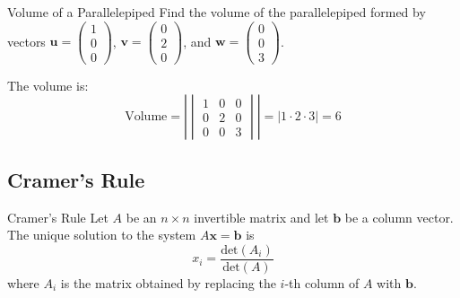\documentclass[12pt,a4paper]{article}
\newcommand{\vv}[1]{\mathbf{#1}}
\newcommand{\Det}{\text{det}}
\begin{document}
	\begin{example}{Volume of a Parallelepiped}
		Find the volume of the parallelepiped formed by vectors $\vv{u} = \begin{pmatrix} 1 \\ 0 \\ 0 \end{pmatrix}$, $\vv{v} = \begin{pmatrix} 0 \\ 2 \\ 0 \end{pmatrix}$, and $\vv{w} = \begin{pmatrix} 0 \\ 0 \\ 3 \end{pmatrix}$.
		
		The volume is:
		\[
		\text{Volume} = \left| \begin{vmatrix} 1 & 0 & 0 \\ 0 & 2 & 0 \\ 0 & 0 & 3 \end{vmatrix} \right| = |1 \cdot 2 \cdot 3| = 6
		\]
	\end{example}
	
	\subsection{Cramer's Rule}
	
	\begin{theorem}{Cramer's Rule}
		Let $A$ be an $n \times n$ invertible matrix and let $\vv{b}$ be a column vector. The unique solution to the system $A\vv{x} = \vv{b}$ is
		\[
		x_i = \frac{\Det(A_i)}{\Det(A)}
		\]
		where $A_i$ is the matrix obtained by replacing the $i$-th column of $A$ with $\vv{b}$.
	\end{theorem}
	
\end{document}
